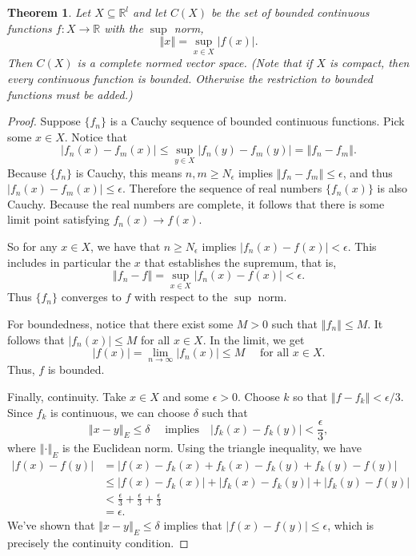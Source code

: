 \documentclass[12pt]{article}
\newcommand{\R}{\mathbb{R}}
\newcommand{\norm}[1]{\left\Vert{#1}\right\Vert}
\newcommand{\abs}[1]{\left\vert{#1}\right\vert}
\newtheorem{theorem}{Theorem}
\theoremstyle{definition}
\begin{document}
\begin{theorem}
	Let $X \subseteq \R^{l}$ and let $C(X)$ be the set of bounded continuous functions $f: X \rightarrow \R$ with the $\sup$ norm,
		\[\norm{x} = \sup_{x \in X} \abs{f(x)}.	\]	
	Then $C(X)$ is a complete normed vector space. (Note that if $X$ is compact, then every continuous function is bounded. Otherwise the restriction to bounded functions must be added.)
	
\end{theorem}
\begin{proof}
	Suppose $\{f_n\}$ is a Cauchy sequence of bounded continuous functions. Pick some $x \in X$. Notice that
		\[\abs{f_n(x) - f_m(x)} \leq \sup_{y \in X} \abs{f_n(y) - f_m(y)} =  \norm{f_n - f_m}.	\]
Because $\{f_n\}$ is Cauchy, this means $n,m \geq N_{\epsilon}$ implies $\norm{f_n-f_m} \leq \epsilon$, and thus $\abs{f_n(x) - f_m(x)} \leq \epsilon$. Therefore the sequence of real numbers $\{f_n(x)\}$ is also Cauchy. Because the real numbers are complete, it follows that there is some limit point satisfying $f_n(x) \rightarrow f(x)$. 

So for any $x \in X$, we have that $n \geq N_{\epsilon}$ implies $\abs{f_n(x) - f(x)} < \epsilon$. This includes in particular the $x$ that establishes the supremum, that is,
	\[\norm{f_n - f} =  \sup_{x \in X} \abs{f_n(x) - f(x)} < \epsilon.	\]
Thus $\{f_n\}$ converges to $f$ with respect to the $\sup$ norm. 

For boundedness, notice that there exist some $M >0$ such that $\norm{f_n} \leq M$. It follows that $\abs{f_n(x)} \leq M$ for all $x \in X$. In the limit, we get
	\[\abs{f(x)} = \lim_{n \rightarrow \infty} \abs{f_n (x)} \leq M \quad \text{ for all } x \in X. 	\]
Thus, $f$ is bounded.

Finally, continuity. Take $x \in X$ and some $\epsilon >0$. Choose $k$ so that $\norm{f - f_k} < \epsilon /3$. Since $f_k$ is continuous, we can choose $\delta$ such that
	\[\norm{x - y}_E \leq \delta \quad \text{ implies} \quad \abs{f_k(x) - f_k(y)} < \frac{\epsilon}{3},	\] 
where $\norm{\cdot}_E$ is the Euclidean norm. Using the triangle inequality, we have
\begin{align*}
	\abs{f(x) - f(y)} &= \abs{f(x) - f_k(x) + f_k(x) - f_k(y) + f_k(y) - f(y)} \\
		&\leq \abs{f(x) - f_k(x)} + \abs{f_k(x) - f_k(y)} + \abs{f_k(y) - f(y)} \\
		&< \frac{\epsilon}{3} + \frac{\epsilon}{3} + \frac{\epsilon}{3} \\
		&=\epsilon.
\end{align*}
We've shown that $\norm{x -y}_E \leq \delta$ implies that $\abs{f(x)- f(y)} \leq \epsilon$, which is precisely the continuity condition. 
\end{proof} 	
\end{document}
